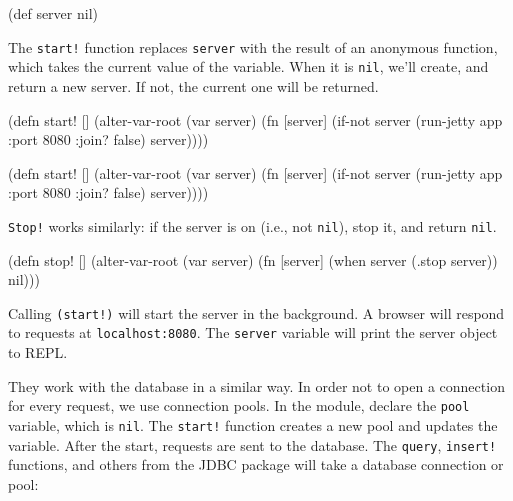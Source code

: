 \begin{english}
  \begin{clojure}
(def server nil)
  \end{clojure}
\end{english}

The \verb|start!| function replaces \verb|server| with the result of an anonymous function, which takes the current value of the variable.
When it is \verb|nil|, we'll create, and return a new server. If not, the current one will be returned.

\ifx\DEVICETYPE\MOBILE

\begin{english}
  \begin{clojure}
(defn start! []
  (alter-var-root
   (var server)
   (fn [server]
     (if-not server
       (run-jetty app {:port 8080
                       :join? false})
       server))))
  \end{clojure}
\end{english}

\else

\begin{english}
  \begin{clojure}
(defn start! []
  (alter-var-root
   (var server)
   (fn [server]
     (if-not server
       (run-jetty app {:port 8080 :join? false})
       server))))
  \end{clojure}
\end{english}

\fi

\noindent
\verb|Stop!| works similarly: if the server is on (i.e., not \verb|nil|), stop it, and return \verb|nil|.

\begin{english}
  \begin{clojure}
(defn stop! []
  (alter-var-root
   (var server)
   (fn [server]
     (when server
       (.stop server))
     nil)))
  \end{clojure}
\end{english}

\mnoindent
Calling \verb|(start!)| will start the server in the background. A browser will respond to requests at \texttt{localhost\-:8080}.
The \verb|server| variable will print the server object to REPL.


They work with the database in a similar way.
In order not to open a connection for every request, we use connection pools.
In the module, declare the \verb|pool| variable, which is \verb|nil|.
The \verb|start!| function creates a new pool and updates the variable. After the start, requests are sent to the database. The \verb|query|, \verb|insert!| functions, and others from the JDBC package will take a database connection or pool:

